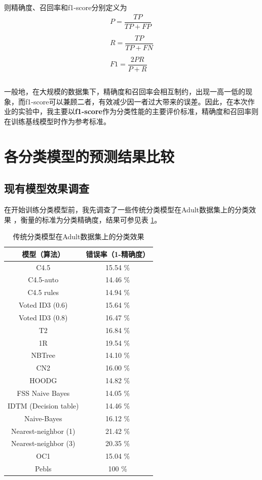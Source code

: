 \documentclass[12pt,a4paper]{article}
\theoremstyle{definition}
\begin{document}
则精确度、召回率和f1-score分别定义为
\begin{equation}
	\begin{aligned}
	P = \dfrac{TP}{TP + FP} \\ \\
	R = \dfrac{TP}{TP + FN} \\ \\
	F1 = \dfrac{2PR}{P + R} \\ \\
	\end{aligned}
\end{equation}

\vspace{-0.03\linewidth}
一般地，在大规模的数据集下，精确度和召回率会相互制约，出现一高一低的现象，而f1-score可以兼顾二者，有效减少因一者过大带来的误差。因此，在本次作业的实验中，我主要以\textbf{f1-score}作为分类性能的主要评价标准，精确度和召回率则在训练基线模型时作为参考标准。

\section{各分类模型的预测结果比较}
\label{sec:model-single}

\subsection{现有模型效果调查}

在开始训练分类模型前，我先调查了一些传统分类模型在Adult数据集上的分类效果 \cite{bench}，衡量的标准为分类精确度，结果可参见表 \ref{tab:bench}。

\begin{table}[H]
	\centering
	\begin{tabular}{c|c}
		模型（算法） & 错误率（1-精确度） \\
		\hline
		\hline
	
		C4.5 & 15.54 \% \\
		C4.5-auto & 14.46 \% \\
		C4.5 rules & 14.94 \% \\
		Voted ID3 (0.6) & 15.64 \% \\
		Voted ID3 (0.8) & 16.47 \% \\
		T2 & 16.84 \% \\
		1R & 19.54 \% \\
		NBTree & 14.10 \% \\
		CN2 & 16.00 \% \\
		HOODG & 14.82 \% \\
		FSS Naive Bayes & 14.05 \% \\
		IDTM (Decision table) & 14.46 \% \\
		Naive-Bayes & 16.12 \% \\
		Nearest-neighbor (1) & 21.42 \% \\
		Nearest-neighbor (3) & 20.35 \% \\
		OC1 & 15.04 \% \\
		Pebls & 100 \% \\
		
	\end{tabular}
	\caption{传统分类模型在Adult数据集上的分类效果}
	\label{tab:bench}
\end{table}
\end{document}
